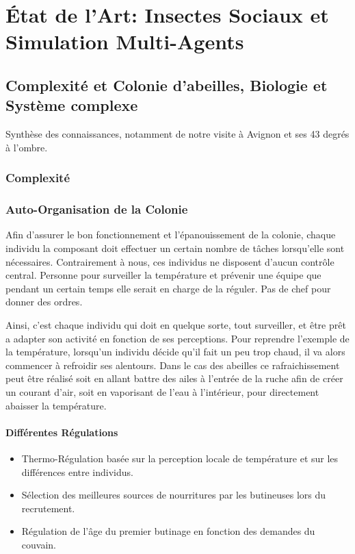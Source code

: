 \chapter{État de l'Art: Insectes Sociaux et Simulation Multi-Agents}
	\section{Complexité et Colonie d'abeilles, Biologie et Système complexe}
			Synthèse des connaissances, notamment de notre visite à Avignon et ses 43 degrés à l'ombre.\\
		\subsection{Complexité}
		\subsection{Auto-Organisation de la Colonie}
			Afin d'assurer le bon fonctionnement et l'épanouissement de la colonie, chaque individu la composant doit effectuer un certain nombre de tâches lorsqu'elle sont nécessaires. Contrairement à nous, ces individus ne disposent d'aucun contrôle central. Personne pour surveiller la température et prévenir une équipe que pendant un certain temps elle serait en charge de la réguler. Pas de chef pour donner des ordres.
			
			Ainsi, c'est chaque individu qui doit en quelque sorte, tout surveiller, et être prêt a adapter son activité en fonction de ses perceptions. Pour reprendre l'exemple de la température, lorsqu'un individu décide qu'il fait un peu trop chaud, il va alors commencer à refroidir ses alentours. Dans le cas des abeilles ce rafraichissement peut être réalisé soit en allant battre des ailes à l'entrée de la ruche afin de créer un courant d'air, soit en vaporisant de l'eau à l'intérieur, pour directement abaisser la température. 		
			
			
			\subsubsection{Différentes Régulations}
			\begin{itemize}
				\item Thermo-Régulation basée sur la perception locale de température et sur les différences entre individus.
				\item Sélection des meilleures sources de nourritures par les butineuses lors du recrutement.
				\item Régulation de l'âge du premier butinage en fonction des demandes du couvain.
			\end{itemize}

